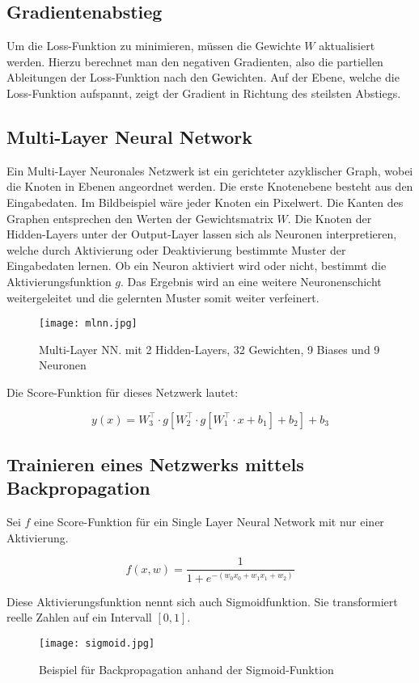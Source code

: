 \documentclass[11pt,ceqn]{book}
\begin{document}
\subsection{Gradientenabstieg}
Um die Loss-Funktion zu minimieren, müssen die Gewichte $W$ aktualisiert werden. Hierzu berechnet man den negativen Gradienten, also die partiellen Ableitungen der Loss-Funktion nach den Gewichten. Auf der Ebene, welche die Loss-Funktion aufspannt, zeigt der Gradient in Richtung des steilsten Abstiegs.


\subsection{Multi-Layer Neural Network}
Ein Multi-Layer Neuronales Netzwerk ist ein gerichteter azyklischer Graph, wobei die Knoten in Ebenen angeordnet werden. Die erste Knotenebene besteht aus den Eingabedaten. Im Bildbeispiel wäre jeder Knoten ein Pixelwert. Die Kanten des Graphen entsprechen den Werten der Gewichtsmatrix $W$. Die Knoten der Hidden-Layers unter der Output-Layer lassen sich als Neuronen interpretieren, welche durch Aktivierung oder Deaktivierung bestimmte Muster der Eingabedaten lernen. Ob ein Neuron aktiviert wird oder nicht, bestimmt die Aktivierungsfunktion $g$. Das Ergebnis wird an eine weitere Neuronenschicht weitergeleitet und die gelernten Muster somit weiter verfeinert.

\begin{figure}[H]
\centering
\texttt{[image: mlnn.jpg]}
\caption{Multi-Layer NN. mit 2 Hidden-Layers, 32 Gewichten, 9 Biases und 9 Neuronen}
\end{figure}

Die Score-Funktion für dieses Netzwerk lautet:

\[y(x) = W_3^{\top} \cdot g[W_2^{\top} \cdot g[W_1^{\top} \cdot x+b_1]+b_2]+b_3\]

\newpage
\subsection{Trainieren eines Netzwerks mittels Backpropagation}
Sei $f$ eine Score-Funktion für ein Single Layer Neural Network mit nur einer Aktivierung.

\[f(x,w) = \frac{1}{1+e^{-(w_0x_0+w_1x_1+w_2)}}\]

Diese Aktivierungsfunktion nennt sich auch Sigmoidfunktion. Sie transformiert reelle Zahlen auf ein Intervall $\left[0, 1\right]$.

\begin{figure}[H]
\centering
\texttt{[image: sigmoid.jpg]}
\caption{Beispiel für Backpropagation anhand der Sigmoid-Funktion}
\end{figure}
\end{document}
